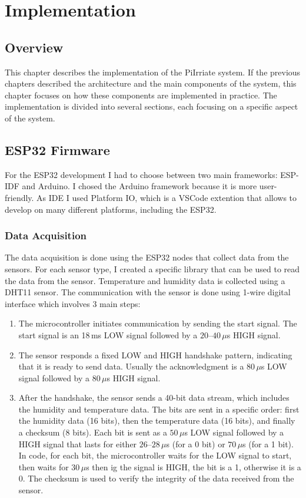 \chapter{Implementation}
\section{Overview}
This chapter describes the implementation of the PiIrriate system. If the previous chapters described the architecture and 
the main components of the system, this chapter focuses on how these components are implemented in practice.
The implementation is divided into several sections, each focusing on a specific aspect of the system.

\section {ESP32 Firmware}
For the ESP32 development I had to choose between two main frameworks: ESP-IDF and Arduino. I
chosed the Arduino framework because it is more user-friendly. As IDE I used Platform IO, which is a VSCode extention
that allows to develop on many different platforms, including the ESP32\cite{platformio_docs}.

\subsection{Data Acquisition}
The data acquisition is done using the ESP32 nodes that collect data from the sensors.
For each sensor type, I created a specific library that can be used to read the data from the sensor.
Temperature and humidity data is collected using a DHT11 sensor. The communication with the sensor is done using
1-wire digital interface which involves 3 main steps\cite{1wire}:
\begin{enumerate}
  \item The microcontroller initiates communication by sending the start signal.
  The start signal is an 18\,ms LOW signal followed by a $20$--$40\,\mu$s HIGH signal.
  \item The sensor responds a fixed LOW and HIGH handshake pattern, indicating that it is ready to send data.
  Usually the acknowledgment is a $80\,\mu$s LOW signal followed by a $80\,\mu$s HIGH signal.
  \item After the handshake, the sensor sends a 40-bit data stream, which includes the humidity and temperature data.
  The bits are sent in a specific order: first the humidity data (16 bits), 
  then the temperature data (16 bits), 
  and finally a checksum (8 bits).
  Each bit is sent as a $50\,\mu$s LOW signal followed by a HIGH signal that lasts for either $26$--$28\,\mu$s (for a 0 bit) or $70\,\mu$s (for a 1 bit).
  In code, for each bit, the microcontroller waits for the LOW signal to start, 
  then waits for $30\,\mu$s then ig the signal is HIGH, the bit is a 1, otherwise it is a 0.
  The checksum is used to verify the integrity of the data received from the sensor.
\end{enumerate}

